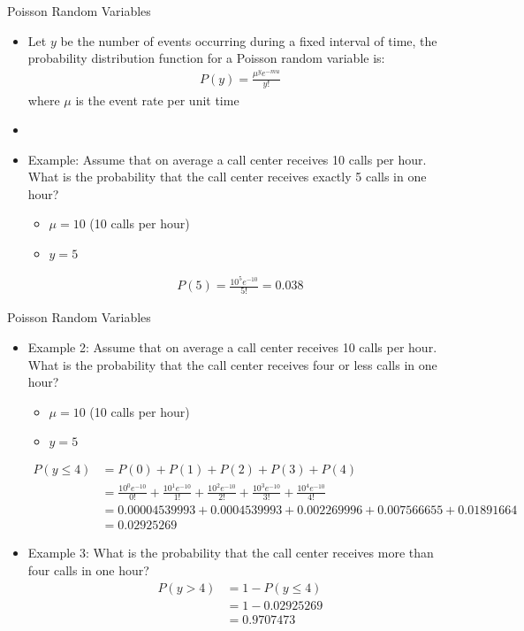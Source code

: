 \documentclass[xcolor=dvipsnames]{beamer}
\begin{document}
\begin{frame}{Poisson Random Variables}
	\begin{itemize}
		\item Let $y$ be the number of events occurring during a fixed interval of time, the probability distribution function for a Poisson random variable is:
		\begin{gather*}
			P(y) = \frac{\mu ^ y e^{-mu}}{y!}
		\end{gather*}
		where $\mu$ is the event rate per unit time
		\item[]
		\item Example: Assume that on average a call center receives 10 calls per hour. What is the probability that the call center receives exactly 5 calls in one hour?
		\begin{itemize}
			\item $\mu = 10$ (10 calls per hour)
			\item $y = 5$
		\end{itemize}
		\begin{align*}
			P(5) = \frac{10^5 e^{-10}}{5!} = 0.038
		\end{align*}
	\end{itemize}
\end{frame}

\begin{frame}{Poisson Random Variables}
	\begin{itemize}
		\item Example 2: Assume that on average a call center receives 10 calls per hour. What is the probability that the call center receives four or less calls in one hour?
		\begin{itemize}
			\item $\mu = 10$ (10 calls per hour)
			\item $y = 5$
		\end{itemize}
	{\scriptsize
		\begin{align*}
		P(y \leq 4) &= P(0) + P(1) + P(2) + P(3) + P(4) \\
		&= \frac{10^0 e^{-10}}{0!} + \frac{10^1 e^{-10}}{1!} + \frac{10^2 e^{-10}}{2!} + \frac{10^3 e^{-10}}{3!} + \frac{10^4 e^{-10}}{4!} \\
		&=  0.00004539993 + 0.0004539993 + 0.002269996 + 0.007566655 + 0.01891664 \\
		&= 0.02925269
		\end{align*}}
	\item Example 3: What is the probability that the call center receives more than four calls in one hour?
	\begin{align*}
		P(y > 4) &= 1 - P(y \leq 4) \\
		&= 1- 0.02925269 \\
		&=  0.9707473
	\end{align*}
	\end{itemize}
\end{frame}
\end{document}
